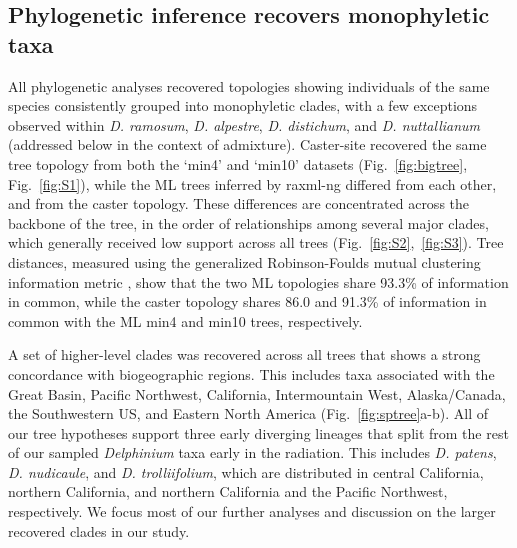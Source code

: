 \documentclass[11pt]{article}
\begin{document}
\subsection{Phylogenetic inference recovers monophyletic taxa}
All phylogenetic analyses recovered topologies showing individuals of the same 
species consistently grouped into monophyletic clades, with a few exceptions 
observed within \emph{D. ramosum}, \emph{D. alpestre}, \emph{D. distichum}, and 
\emph{D. nuttallianum} (addressed below in the context of admixture).
% 
Caster-site recovered the same tree topology from both the `min4' and `min10' 
datasets (Fig.~\ref{fig:bigtree}, Fig.~\ref{fig:S1}), while the ML trees
inferred by raxml-ng differed from each other, and from the caster topology.
% 
These differences are concentrated across the backbone of the tree, in the 
order of relationships among several major clades, which generally received
low support across all trees
(Fig.~\ref{fig:S2},~\ref{fig:S3}).
% 
Tree distances, measured using the generalized Robinson-Foulds mutual clustering
information metric \citep[MCI;][]{smith_information_2020}, show that the two
ML topologies share 93.3\% of information in common, while the caster topology
shares 86.0 and 91.3\% of information in common with the ML min4 and min10 
trees, respectively.


A set of higher-level clades was recovered across all trees that shows a strong
concordance with biogeographic regions.
This includes taxa associated with the Great Basin, Pacific Northwest, California, 
Intermountain West, Alaska/Canada, the Southwestern US, and Eastern North America
(Fig.~\ref{fig:sptree}a-b). 
% 
All of our tree hypotheses support three early diverging lineages that split
from the rest of our sampled \emph{Delphinium} taxa early in the radiation. 
This includes \emph{D. patens}, \emph{D. nudicaule}, and \emph{D. trolliifolium},
which are distributed in central California, northern California, and northern 
California and the Pacific Northwest, respectively. We focus most of our further
analyses and discussion on the larger recovered clades in our study.
% 
\end{document}
